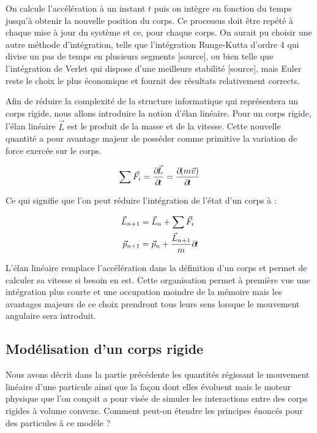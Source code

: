 On calcule l'accélération à un instant $t$ puis on intègre en fonction
du temps jusqu'à obtenir la nouvelle position du corps. Ce processus
doit être repété à chaque mise à jour du système et ce, pour chaque
corps. On aurait pu choisir une autre méthode d'intégration, telle que
l'intégration Runge-Kutta d'ordre 4 qui divise un pas de temps en
plusieurs segments [source], ou bien telle que l'intégration de Verlet
qui dispose d'une meilleure stabilité [source], mais Euler reste le
choix le plus économique et fournit des résultats relativement
corrects.

Afin de réduire la complexité de la structure informatique qui
représentera un corps rigide, nous allons introduire la notion d'élan
linéaire. Pour un corps rigide, l'élan linéaire $\vec{L}$ est le
produit de la masse et de la vitesse. Cette nouvelle quantité a pour
avantage majeur de posséder comme primitive la variation de force
exercée sur le corps.

\begin{align*}
  {\sum \vec{F}_i} = \frac{\partial \! \vec{L}}{\partial \! t} = \frac{\partial \! (m\vec{v})}{\partial \! t}
\end{align*}

Ce qui signifie que l'on peut réduire l'intégration de l'état d'un
corps à :

\begin{align*}
  \vec{L}_{n+1} &= \vec{L}_n + {\sum \vec{F}_i} \\ \vec{p}_{n+1} &=
  \vec{p}_n + \frac{\vec{L}_{n+1}}{m} \partial \! t
\end{align*}

L'élan linéaire remplace l'accélération dans la définition d'un corps
et permet de calculer sa vitesse si besoin en est. Cette organisation
permet à première vue une intégration plus courte et une occupation
moindre de la mémoire mais les avantages majeurs de ce choix prendront
tous leurs sens lorsque le mouvement angulaire sera introduit.

\subsection{Modélisation d'un corps rigide}

Nous avons décrit dans la partie précédente les quantités régissant le
mouvement linéaire d'une particule ainsi que la façon dont elles
évoluent mais le moteur physique que l'on conçoit a pour visée de
simuler les interactions entre des corps rigides à volume
convexe. Comment peut-on étendre les principes énoncés pour des
particules à ce modèle ?

